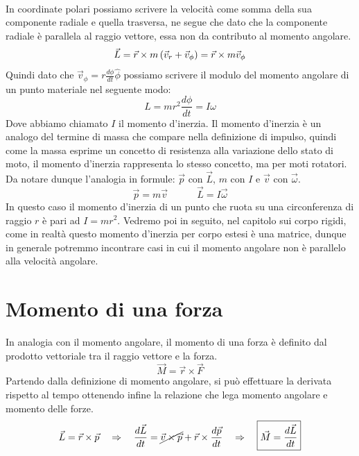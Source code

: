 \\
In coordinate polari possiamo scrivere la velocità come somma della sua
componente radiale e quella trasversa, ne segue che dato che la componente
radiale è parallela al raggio vettore, essa non da contributo al momento
angolare.
\begin{equation}
    \vec L = \vec r \times m\left( \vec v_r+\vec v_\phi\right) = \vec r \times m\vec v_\phi
\end{equation}
Quindi dato che $\vec v_\phi = r\frac{d\phi}{dt}\hat\phi$ possiamo scrivere il modulo
del momento angolare di un punto materiale nel seguente modo:
\begin{equation}
    \boxed{L = mr^2\frac{d\phi}{dt} = I\omega}
\label{eq:momentum:l=Iw}
\end{equation}
Dove abbiamo chiamato $I$ il momento d'inerzia. Il momento d'inerzia è un
analogo del termine di massa che compare nella definizione di impulso,
quindi come la massa esprime un concetto di resistenza alla variazione dello
stato di moto, il momento d'inerzia rappresenta lo stesso concetto, ma per
moti rotatori. Da notare dunque l'analogia in formule:
$\vec p$ con $\vec L$, $m$ con $I$ e $\vec v$ con $\vec \omega$.
\begin{equation}
\vec p = m\vec v \quad\quad \quad \vec L = I\vec\omega
\end{equation} 
In questo caso il momento d'inerzia di un punto che ruota su una
circonferenza di raggio $r$ è pari ad $I = mr^2$. Vedremo poi in seguito,
nel capitolo sui corpo rigidi, come in realtà questo momento d'inerzia per
corpo estesi è una matrice, dunque in generale potremmo incontrare casi in
cui il momento angolare non è parallelo alla velocità angolare.
\section{Momento di una forza}
In analogia con il momento angolare, il momento di una forza è definito dal
prodotto vettoriale tra il raggio vettore e la forza.
\begin{equation}
    \boxed{\vec M = \vec r \times \vec F}
\label{eq:momentum:M_def}
\end{equation}
Partendo dalla definizione di momento angolare, si può effettuare la derivata
rispetto al tempo ottenendo infine la relazione che lega momento angolare e
momento delle forze.
\begin{equation}
    \vec L = \vec r \times \vec p \quad\Rightarrow\quad \frac{d\vec L}{dt} =
    \cancel{\vec v\times\vec p} + \vec r \times \frac{d\vec p}{dt} \quad\Rightarrow\quad
    \boxed{\vec M = \frac{d\vec L}{dt}}
\label{eq:momentum:M=dot_L}
\end{equation}
